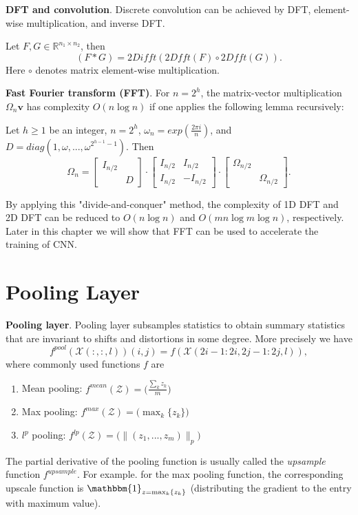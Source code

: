{\bf DFT and convolution}. Discrete convolution can be achieved by DFT, element-wise multiplication, and inverse DFT.
\begin{lemma}
Let $F, G\in\mathbb{R}^{n_1\times n_2}$, then
\begin{equation}
(F\ast G) = 2Difft(2Dfft(F)\circ 2Dfft(G)).
\end{equation}
Here $\circ$ denotes matrix element-wise multiplication.
\end{lemma}

{\bf Fast Fourier transform (FFT)}.
For $n=2^h$, the matrix-vector multiplication $\Omega_n\bm v$ has complexity $O(n\log n)$ if one applies the following lemma recursively:
\begin{lemma}
Let $h\ge 1$ be an integer, $n=2^h$, $\omega_n=exp(\frac{2\pi i}{n})$, and $D = diag(1, \omega,...,\omega^{2^{h-1}-1})$. Then
\begin{equation}
\Omega_n = \left[
\begin{array}{cc}
I_{n/2} & \\
 & D
\end{array}
\right]\cdot
\left[
\begin{array}{cc}
I_{n/2} & I_{n/2}\\
I_{n/2} & -I_{n/2}
\end{array}
\right]\cdot
\left[
\begin{array}{cc}
\Omega_{n/2} &\\
 & \Omega_{n/2}
\end{array}
\right].
\end{equation}
\end{lemma}
By applying this "divide-and-conquer" method, the complexity of 1D DFT and 2D DFT can be reduced to $O(n\log n)$ and $O(mn\log m\log n)$, respectively. Later in this chapter we will show that FFT can be used to accelerate the training of CNN.

\section{Pooling Layer}

{\bf Pooling layer}. Pooling layer subsamples statistics to obtain summary statistics that are invariant to shifts and distortions in some degree. More precisely we have
\begin{equation}
f^{pool}(\mathcal{X}(:,:,l))(i,j) = f(\mathcal{X}(2i-1:2i,2j-1:2j,l)),
\end{equation} 
where commonly used functions $f$ are
\begin{enumerate}
\item
Mean pooling: $f^{mean}(\mathcal{Z})=\big(\frac{\sum_k z_k}{m}\big)$
\item
Max pooling: $f^{max}(\mathcal{Z})=\big(\max_k\{z_k\}\big)$
\item
$l^p$ pooling: $f^{lp}(\mathcal{Z})=\big(\|(z_1,...,z_m)\|_p\big)$
\end{enumerate}
The partial derivative of the pooling function is usually called the \textit{upsample} function $f^{upsample}$. For example. for the max pooling function, the corresponding upscale function is $\mathbbm{1}_{z = \max_k\{z_k\}}$ (distributing the gradient to the entry with maximum value). 


